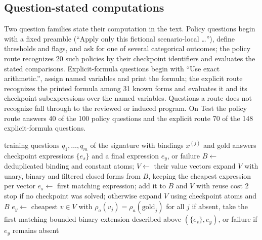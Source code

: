 \documentclass[conference]{IEEEtran}
\begin{document}
\subsection{Question-stated computations}
Two question families state their computation in the text. Policy questions begin with a fixed preamble (``Apply only this fictional scenario-local \ldots''), define thresholds and flags, and ask for one of several categorical outcomes; the policy route recognizes 20 such policies by their checkpoint identifiers and evaluates the stated comparisons. Explicit-formula questions begin with ``Use exact arithmetic.'', assign named variables and print the formula; the explicit route recognizes the printed formula among 31 known forms and evaluates it and its checkpoint subexpressions over the named variables. Questions a route does not recognize fall through to the reviewed or induced program. On Test the policy route answers 40 of the 100 policy questions and the explicit route 70 of the 148 explicit-formula questions.

\begin{algorithm}[t]
\caption{Numeric program induction for one wording signature}
\label{alg:induction}
\small
\begin{algorithmic}[1]
\Require training questions $q_1,\dots,q_m$ of the signature with bindings $x^{(j)}$ and gold answers
\Ensure checkpoint expressions $\{e_s\}$ and a final expression $e_y$, or failure
\State $B\gets$ deduplicated binding and constant atoms; $V\gets$ their value vectors
\State expand $V$ with unary, binary and filtered closed forms from $B$, keeping the cheapest expression per vector
      \State $e_s\gets$ first matching expression; add it to $B$ and $V$ with reuse cost 2
    \EndIf
  \EndFor
  \State stop if no checkpoint was solved; otherwise expand $V$ using checkpoint atoms and $B$
\EndFor
\State $e_y\gets$ cheapest $v\in V$ with $\rho_a(v_j)=\rho_a(\text{gold}_j)$ for all $j$
\State if absent, take the first matching bounded binary extension described above
\State \Return $(\{e_s\},e_y)$, or failure if $e_y$ remains absent
\end{algorithmic}
\end{algorithm}
\end{document}
